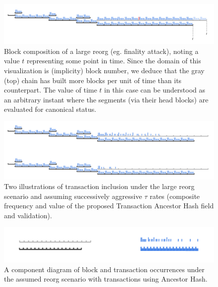 \documentclass[11pt]{article}
\theoremstyle{plain}
\begin{document}
\begin{figure}[tph]
    \centering
    \includegraphics[width=1.0\textwidth]{imgs/vis_blocksegment_forking_reorg_t.png}
    \caption{Block composition of a large reorg (eg. finality attack), noting a
    value $t$ representing some point in time.
    Since the domain of this visualization is (implicity) block number, we deduce
    that the gray (top) chain has built more blocks per unit of time than its
    counterpart.
    The value of time $t$ in this case can be understood as an arbitrary instant
    where the segments (via their head blocks) are evaluated for canonical status.
    }
    \label{fig:blocksegment_forks_reorg__t}
\end{figure}

\begin{figure}[tph]
    \centering
    \includegraphics[width=1.0\textwidth]{imgs/vis_blocksegment_forking_reorg_anchash.png
    }
    \caption{Two illustrations of transaction inclusion under the large reorg
    scenario and assuming successively aggressive $\tau$ rates (composite frequency
    and value of the proposed Transaction Ancestor Hash field and validation).
    }
    \label{fig:blocksegment_forks_reorg_anchash}
\end{figure}

\begin{figure}[tph]
    \centering
    \includegraphics[width=1.0\textwidth]{imgs/vis_blocksegment_canonpref_abstract.png}
    \caption{
        A component diagram of block and transaction occurrences under the assumed
        reorg scenario with transactions using Ancestor Hash.
    }
    \label{fig:blocksegment_forks_canonpref_abstract_ex}
\end{figure}
\end{document}
